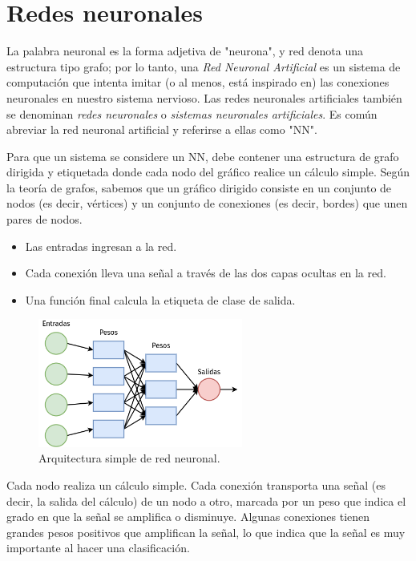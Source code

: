 \documentclass[a4paper,12pt]{article}
\begin{document}
\clearpage

\section{Redes neuronales}
La palabra neuronal es la forma adjetiva de "neurona", y red denota una estructura tipo grafo; por lo tanto, una \textit{Red Neuronal Artificial} es un sistema de computación que intenta imitar (o al menos, está inspirado en) las conexiones neuronales en nuestro sistema nervioso. Las redes neuronales artificiales también se denominan \textit{redes neuronales} o \textit{sistemas neuronales artificiales}. Es común abreviar la red neuronal artificial y referirse a ellas como "NN". \citep{rosebrock2017deep}

Para que un sistema se considere un NN, debe contener una estructura de grafo dirigida y etiquetada donde cada nodo del gráfico realice un cálculo simple. Según la teoría de grafos, sabemos que un gráfico dirigido consiste en un conjunto de nodos (es decir, vértices) y un conjunto de conexiones (es decir, bordes) que unen pares de nodos.

\begin{itemize}[noitemsep, topsep=2pt]
	\item Las entradas ingresan a la red. 
	\item Cada conexión lleva una señal a través de las dos capas ocultas en la red. 
	\item Una función final calcula la etiqueta de clase de salida.
\end{itemize}

\begin{figure}[H]
	\begin{center}				
		\includegraphics[width=0.6\textwidth]{018.png}
		\caption{Arquitectura simple de red neuronal. \cite{matich}}
		\label{fig:nn}
	\end{center}
\end{figure}

Cada nodo realiza un cálculo simple. Cada conexión transporta una señal (es decir, la salida del cálculo) de un nodo a otro, marcada por un peso que indica el grado en que la señal se amplifica o disminuye. Algunas conexiones tienen grandes pesos positivos que amplifican la señal, lo que indica que la señal es muy importante al hacer una clasificación. 
\end{document}
